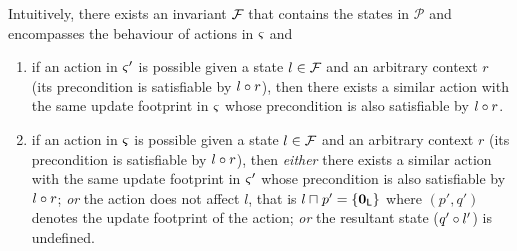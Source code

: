 Intuitively, there exists an invariant $\mathcal{F}_{}$ that contains the states in $\mathcal{P}$ and encompasses the behaviour of actions in $\varsigma_{}$ and 
\begin{enumerate}
	\item if an action in $\varsigma_{}'$ is possible given a state $l \in \mathcal{F}_{}$ and an arbitrary context $r$ (its precondition is satisfiable by $l \circ r$), then there exists a similar action with the same update footprint in $\varsigma_{}$ whose precondition is also satisfiable by $l \circ r$. 
	\item if an action in $\varsigma_{}$ is possible given a state $l \in \mathcal{F}_{}$ and an arbitrary context $r$ (its precondition is satisfiable by $l \circ r$), then \emph{either}  there exists a similar action with the same update footprint in $\varsigma_{}'$ whose precondition is also satisfiable by $l \circ r$; \emph{or} the action does not affect $l$, that is  $l \sqcap_{} p' = \{\mathbf{0}_{\textsf{L}}\}$ where $(p', q')$ denotes the update footprint of the action; \emph{or}  the resultant state ($q' \circ l'$) is undefined.
\end{enumerate} 

